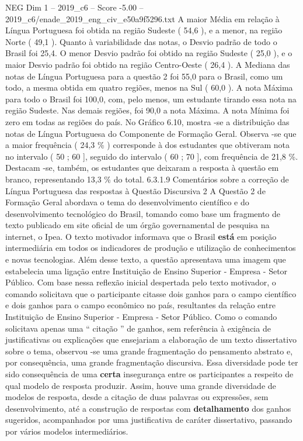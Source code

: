 \begin{textsample}{NEG Dim 1 – 2019\_c6 – Score -5.00 – 2019\_c6/enade\_2019\_eng\_civ\_e50a9f5296.txt}
A maior Média em relação à Língua Portuguesa foi obtida na região Sudeste ( 54,6 ), e a menor, na região Norte ( 49,1 ).
Quanto à variabilidade das notas, o Desvio padrão de todo o Brasil foi 25,4.
O menor Desvio padrão foi obtido na região Sudeste ( 25,0 ), e o maior Desvio padrão foi obtido na região Centro-Oeste ( 26,4 ).
A Mediana das notas de Língua Portuguesa para a questão 2 foi 55,0 para o Brasil, como um todo, a mesma obtida em quatro regiões, menos na Sul ( 60,0 ).
A nota Máxima para todo o Brasil foi 100,0, com, pelo menos, um estudante tirando essa nota na região Sudeste.
Nas demais regiões, foi 90,0 a nota Máxima.
A nota Mínima foi zero em todas as regiões do país.
No Gráfico 6.10, mostra -se a distribuição das notas de Língua Portuguesa do Componente de Formação Geral.
Observa -se que a maior frequência ( 24,3 \% ) corresponde à dos estudantes que obtiveram nota no intervalo ( 50 ; 60 ], seguido do intervalo ( 60 ; 70 ], com frequência de 21,8 \%.
Destacam -se, também, os estudantes que deixaram a resposta à questão em branco, representando 13,3 \% do total. 6.3.1.9 Comentários sobre a correção de Língua Portuguesa das respostas à Questão Discursiva 2 A Questão 2 de Formação Geral abordava o tema do desenvolvimento científico e do desenvolvimento tecnológico do Brasil, tomando como base um fragmento de texto publicado em site oficial de um órgão governamental de pesquisa na internet, o Ipea.
O texto motivador informava que o Brasil \textbf{está} em posição intermediária em todos os indicadores de produção e utilização de conhecimentos e novas tecnologias.
Além desse texto, a questão apresentava uma imagem que estabelecia uma ligação entre Instituição de Ensino Superior - Empresa - Setor Público.
Com base nessa reflexão inicial despertada pelo texto motivador, o comando solicitava que o participante citasse dois ganhos para o campo científico e dois ganhos para o campo econômico no país, resultantes da relação entre Instituição de Ensino Superior - Empresa - Setor Público.
Como o comando solicitava apenas uma “ citação ” de ganhos, sem referência à exigência de justificativas ou explicações que ensejariam a elaboração de um texto dissertativo sobre o tema, observou -se uma grande fragmentação do pensamento abstrato e, por consequência, uma grande fragmentação discursiva.
Essa diversidade pode ter sido consequência de uma \textbf{certa} insegurança entre os participantes a respeito de qual modelo de resposta produzir.
Assim, houve uma grande diversidade de modelos de resposta, desde a citação de duas palavras ou expressões, sem desenvolvimento, até a construção de respostas com \textbf{detalhamento} dos ganhos sugeridos, acompanhados por uma justificativa de caráter dissertativo, passando por vários modelos intermediários.

\end{textsample}
